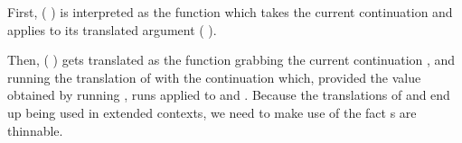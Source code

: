 First, ( ) is interpreted as the function which takes the current
continuation and applies to its translated argument ( ).


Then, (  ) gets translated as the function grabbing the
current continuation , and running the translation of  with the
continuation which, provided the value  obtained by running ,
runs  applied to  and . Because the translations of 
and  end up being used in extended contexts, we need to make use of the
fact s are thinnable.


